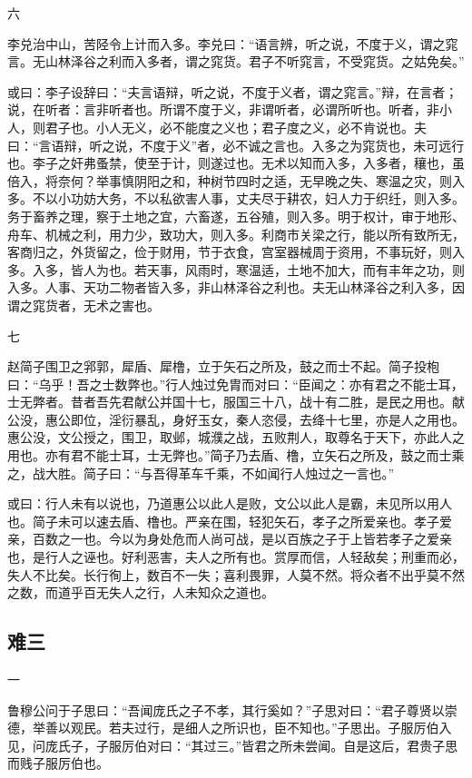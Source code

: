 \documentclass[]{article}
\begin{document}
六

李兑治中山，苦陉令上计而入多。李兑曰：``语言辨，听之说，不度于义，谓之窕言。无山林泽谷之利而入多者，谓之窕货。君子不听窕言，不受窕货。之姑免矣。''

或曰：李子设辞曰：``夫言语辩，听之说，不度于义者，谓之窕言。''辩，在言者；说，在听者：言非听者也。所谓不度于义，非谓听者，必谓所听也。听者，非小人，则君子也。小人无义，必不能度之义也；君子度之义，必不肯说也。夫曰：``言语辩，听之说，不度于义''者，必不诚之言也。入多之为窕货也，未可远行也。李子之奸弗蚤禁，使至于计，则遂过也。无术以知而入多，入多者，穰也，虽倍入，将奈何？举事慎阴阳之和，种树节四时之适，无早晚之失、寒温之灾，则入多。不以小功妨大务，不以私欲害人事，丈夫尽于耕农，妇人力于织纴，则入多。务于畜养之理，察于土地之宜，六畜遂，五谷殖，则入多。明于权计，审于地形、舟车、机械之利，用力少，致功大，则入多。利商市关梁之行，能以所有致所无，客商归之，外货留之，俭于财用，节于衣食，宫室器械周于资用，不事玩好，则入多。入多，皆人为也。若天事，风雨时，寒温适，土地不加大，而有丰年之功，则入多。人事、天功二物者皆入多，非山林泽谷之利也。夫无山林泽谷之利入多，因谓之窕货者，无术之害也。

七

赵简子围卫之郛郭，犀盾、犀橹，立于矢石之所及，鼓之而士不起。简子投枹曰：``乌乎！吾之士数弊也。''行人烛过免胄而对曰：``臣闻之：亦有君之不能士耳，士无弊者。昔者吾先君献公并国十七，服国三十八，战十有二胜，是民之用也。献公没，惠公即位，淫衍暴乱，身好玉女，秦人恣侵，去绛十七里，亦是人之用也。惠公没，文公授之，围卫，取邺，城濮之战，五败荆人，取尊名于天下，亦此人之用也。亦有君不能士耳，士无弊也。''简子乃去盾、橹，立矢石之所及，鼓之而士乘之，战大胜。简子曰：``与吾得革车千乘，不如闻行人烛过之一言也。''

或曰：行人未有以说也，乃道惠公以此人是败，文公以此人是霸，未见所以用人也。简子未可以速去盾、橹也。严亲在围，轻犯矢石，孝子之所爱亲也。孝子爱亲，百数之一也。今以为身处危而人尚可战，是以百族之子于上皆若孝子之爱亲也，是行人之诬也。好利恶害，夫人之所有也。赏厚而信，人轻敌矣；刑重而必，失人不比矣。长行徇上，数百不一失；喜利畏罪，人莫不然。将众者不出乎莫不然之数，而道乎百无失人之行，人未知众之道也。

\hypertarget{header-n1538}{%
\subsection{难三}\label{header-n1538}}

一

鲁穆公问于子思曰：``吾闻庞氏之子不孝，其行奚如？''子思对曰：``君子尊贤以崇德，举善以观民。若夫过行，是细人之所识也，臣不知也。''子思出。子服厉伯入见，问庞氏子，子服厉伯对曰：``其过三。''皆君之所未尝闻。自是这后，君贵子思而贱子服厉伯也。
\end{document}
